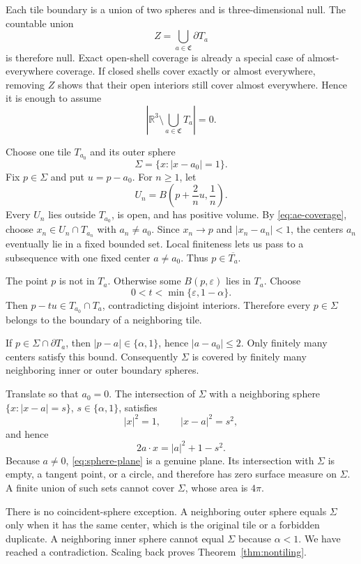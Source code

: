 \documentclass[11pt]{article}
\numberwithin{equation}{section}
\theoremstyle{definition}
\theoremstyle{remark}
\newcommand{\R}{\mathbb R}
\begin{document}
Each tile boundary is a union of two spheres and is three-dimensional null.
The countable union
\[
  Z=\bigcup_{a\in\mathfrak C}\partial T_a
\]
is therefore null.  Exact open-shell coverage is already a special case of
almost-everywhere coverage.  If closed shells cover exactly or almost
everywhere, removing \(Z\) shows that their open interiors still cover almost
everywhere.  Hence it is enough to assume
\begin{equation}
  \left|\R^3\setminus\bigcup_{a\in\mathfrak C}T_a\right|=0.
  \label{eq:ae-coverage}
\end{equation}

Choose one tile \(T_{a_0}\) and its outer sphere
\[
  \Sigma=\{x:|x-a_0|=1\}.
\]
Fix \(p\in\Sigma\) and put \(u=p-a_0\).  For \(n\ge1\), let
\[
  U_n=B\left(p+\frac2n u,\frac1n\right).
\]
Every \(U_n\) lies outside \(T_{a_0}\), is open, and has positive volume.
By \eqref{eq:ae-coverage}, choose \(x_n\in U_n\cap T_{a_n}\) with
\(a_n\ne a_0\).  Since \(x_n\to p\) and \(|x_n-a_n|<1\), the centers
\(a_n\) eventually lie in a fixed bounded set.  Local finiteness lets us
pass to a subsequence with one fixed center \(a\ne a_0\).  Thus
\(p\in\overline{T_a}\).

The point \(p\) is not in \(T_a\).  Otherwise some
\(B(p,\varepsilon)\) lies in \(T_a\).  Choose
\[
  0<t<\min\{\varepsilon,1-\alpha\}.
\]
Then \(p-tu\in T_{a_0}\cap T_a\), contradicting disjoint interiors.
Therefore every \(p\in\Sigma\) belongs to the boundary of a neighboring
tile.

If \(p\in\Sigma\cap\partial T_a\), then
\(|p-a|\in\{\alpha,1\}\), hence \(|a-a_0|\le2\).  Only finitely many
centers satisfy this bound.  Consequently \(\Sigma\) is covered by finitely
many neighboring inner or outer boundary spheres.

Translate so that \(a_0=0\).  The intersection of \(\Sigma\) with a
neighboring sphere \(\{x:|x-a|=s\}\), \(s\in\{\alpha,1\}\), satisfies
\[
  |x|^2=1,
  \qquad |x-a|^2=s^2,
\]
and hence
\begin{equation}
  2a\cdot x=|a|^2+1-s^2.
  \label{eq:sphere-plane}
\end{equation}
Because \(a\ne0\), \eqref{eq:sphere-plane} is a genuine plane.  Its
intersection with \(\Sigma\) is empty, a tangent point, or a circle, and
therefore has zero surface measure on \(\Sigma\).  A finite union of such
sets cannot cover \(\Sigma\), whose area is \(4\pi\).

There is no coincident-sphere exception.  A neighboring outer sphere equals
\(\Sigma\) only when it has the same center, which is the original tile or a
forbidden duplicate.  A neighboring inner sphere cannot equal \(\Sigma\)
because \(\alpha<1\).  We have reached a contradiction.  Scaling back proves
Theorem~\ref{thm:nontiling}.
\end{document}
